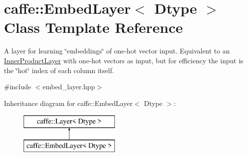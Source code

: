 \hypertarget{classcaffe_1_1EmbedLayer}{}\section{caffe\+:\+:Embed\+Layer$<$ Dtype $>$ Class Template Reference}
\label{classcaffe_1_1EmbedLayer}


A layer for learning \char`\"{}embeddings\char`\"{} of one-\/hot vector input. Equivalent to an \hyperlink{classcaffe_1_1InnerProductLayer}{Inner\+Product\+Layer} with one-\/hot vectors as input, but for efficiency the input is the \char`\"{}hot\char`\"{} index of each column itself.  




{\ttfamily \#include $<$embed\+\_\+layer.\+hpp$>$}

Inheritance diagram for caffe\+:\+:Embed\+Layer$<$ Dtype $>$\+:\begin{figure}[H]
\begin{center}
\leavevmode
\includegraphics[height=2.000000cm]{classcaffe_1_1EmbedLayer}
\end{center}
\end{figure}
